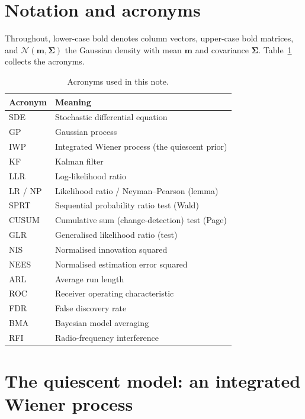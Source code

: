 \documentclass[11pt]{article}
\newcommand{\Norm}{\mathcal{N}}
\begin{document}
\section{Notation and acronyms}

Throughout, lower-case bold denotes column vectors, upper-case bold matrices, and
$\Norm(\bm{m},\bm{\Sigma})$ the Gaussian density with mean $\bm{m}$ and covariance
$\bm{\Sigma}$. Table~\ref{tab:acro} collects the acronyms.

\begin{table}[h]
\centering
\small
\begin{tabular}{ll}
\toprule
Acronym & Meaning \\
\midrule
SDE   & Stochastic differential equation \\
GP    & Gaussian process \\
IWP   & Integrated Wiener process (the quiescent prior) \\
KF    & Kalman filter \\
LLR   & Log-likelihood ratio \\
LR / NP & Likelihood ratio / Neyman--Pearson (lemma) \\
SPRT  & Sequential probability ratio test (Wald) \\
CUSUM & Cumulative sum (change-detection) test (Page) \\
GLR   & Generalised likelihood ratio (test) \\
NIS   & Normalised innovation squared \\
NEES  & Normalised estimation error squared \\
ARL   & Average run length \\
ROC   & Receiver operating characteristic \\
FDR   & False discovery rate \\
BMA   & Bayesian model averaging \\
RFI   & Radio-frequency interference \\
\bottomrule
\end{tabular}
\caption{Acronyms used in this note.}
\label{tab:acro}
\end{table}

\section{The quiescent model: an integrated Wiener process}
\label{sec:iwp}
\end{document}
